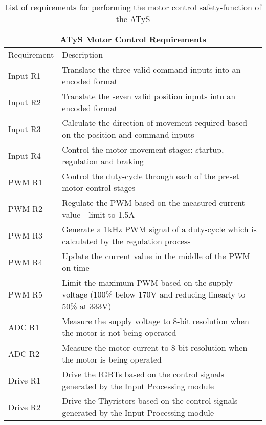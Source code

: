 \begin{table}[t]
\centering
\begin{tabular}{ |p{}|p{}| }
 \hline
 \multicolumn{2}{|c|}{ATyS Motor Control Requirements} \\
 \hline
 Requirement & Description \\
 \hline
 \hline

 Input R1 & Translate the three valid command inputs into an encoded format \\
 \hline 
 Input R2 & Translate the seven valid position inputs into an encoded format \\
 \hline 
 Input R3 & Calculate the direction of movement required based on the position and command inputs \\
 \hline 
 Input R4 & Control the motor movement stages: startup, regulation and braking \\
 \hline
 PWM R1 & Control the duty-cycle through each of the preset motor control stages \\
 \hline
 PWM R2 & Regulate the PWM based on the measured current value - limit to 1.5A \\
 \hline 
 PWM R3 & Generate a 1kHz PWM signal of a duty-cycle which is calculated by the regulation process \\
 \hline 
 PWM R4 & Update the current value in the middle of the PWM on-time \\
 \hline
 PWM R5 & Limit the maximum PWM based on the supply voltage (100\% below 170V and reducing linearly to 50\% at 333V) \\
 \hline
 ADC R1 & Measure the supply voltage to 8-bit resolution when the motor is not being operated \\
 \hline
 ADC R2 & Measure the motor current to 8-bit resolution when the motor is being operated \\
 \hline
 Drive R1 & Drive the IGBTs based on the control signals generated by the Input Processing module %
 \\
  \hline
 Drive R2 & Drive the Thyristors based on the control signals generated by the Input Processing module \\
 \hline
\end{tabular}

\caption{List of requirements for performing the motor control safety-function of the ATyS}
\label{requirements-table}
\end {table}